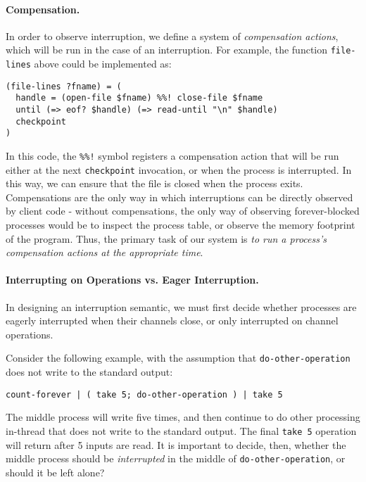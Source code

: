 \documentclass[sigplan,10pt,nosumlimits]{acmart}
\begin{document}
\paragraph{Compensation.} In order to observe interruption, we define a system of \emph{compensation actions}, which will be run in the case of an interruption.
For example, the function \verb/file-lines/ above could be implemented as:

\begin{verbatim}
(file-lines ?fname) = (
  handle = (open-file $fname) %%! close-file $fname
  until (=> eof? $handle) (=> read-until "\n" $handle)
  checkpoint
)
\end{verbatim}

In this code, the \verb/%%!/ symbol registers a compensation action that will be run either at the next \verb/checkpoint/ invocation, or when the process is interrupted. In this way, we can ensure that the file is closed when the process exits. Compensations are the only way in which interruptions can be directly observed by client code - without compensations, the only way of observing forever-blocked processes would be to inspect the process table, or observe the memory footprint of the program. Thus, the primary task of our system is \emph{to run a process's compensation actions at the appropriate time}.

\paragraph{Interrupting on Operations vs. Eager Interruption.}

In designing an interruption semantic, we must first decide whether processes are eagerly interrupted when their channels close, or only interrupted on channel operations.

Consider the following example, with the assumption that \verb/do-other-operation/ does not write to the standard output:

\begin{verbatim}
count-forever | ( take 5; do-other-operation ) | take 5
\end{verbatim}

The middle process will write five times, and then continue to do other processing in-thread that does not write to the standard output.
The final \verb/take 5/ operation will return after 5 inputs are read.
It is important to decide, then, whether the middle process should be \emph{interrupted} in the middle of \verb/do-other-operation/, or should it be left alone?
\end{document}
